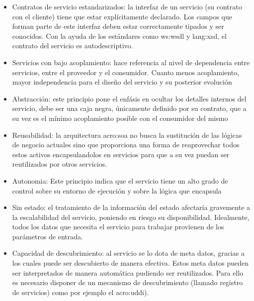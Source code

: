 
\begin{itemize}
  \item Contratos de servicio estandarizados: la interfaz de un servicio (su contrato con el cliente) tiene que estar explícitamente declarado. Los campos  que forman parte de este interfaz deben estar correctamente tipados y ser conocidos. Con la ayuda de los estándares como \gls{ws:wsdl} y \gls{lang:xsd}, el contrato del servicio es autodescriptivo.

  \item Servicios con bajo acoplamiento: hace referencia al nivel de dependencia entre servicios, entre el proveedor y el consumidor. Cuanto menos acoplamiento, mayor independencia para el diseño del servicio y su posterior evolución

  \item Abstracción: este principio pone el enfásis en ocultar los detalles internos del servicio, debe ser una caja negra, únicamente definido por su contrato, que a su vez es el mínimo acoplamiento posible con el consumidor del mismo

  \item Reusabilidad: la arquitectura \gls{acro:soa} no busca la sustitución de las lógicas de negocio actuales sino que proporciona una forma de reaprovechar todos estos activos encapsulandolos en servicios para que a su vez puedan ser reutilizados por otros servicios.

  \item Autonomia: Este principio indica que el servicio tiene un alto grado de control sobre su entorno de ejecución y sobre la lógica que encapsula

  \item Sin estado: el tratamiento de la información del estado afectaría gravemente a la escalabilidad del servicio, poniendo en riesgo su disponibilidad. Idealmente, todos los datos que necesita el servicio para trabajar provienen de los parámetros de entrada.

  \item Capacidad de descubrimiento: al servicio se lo dota de meta datos, gracias a los cuales puede ser descubierto de manera efectiva. Estos meta datos pueden ser interpretados de manera automática pudiendo ser reutilizados. Para ello es necesario disponer de un mecanismo de descubrimiento (llamado registro de servicios) como por ejemplo el \gls{acro:uddi}).


\end{itemize}
